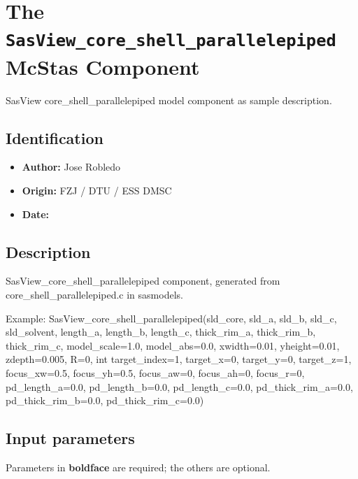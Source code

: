\section{The \texttt{SasView\_core\_shell\_parallelepiped} McStas Component}
SasView core\_shell\_parallelepiped model component as sample description.

\subsection*{Identification}
\begin{itemize}
  \item \textbf{Author:} Jose Robledo
  \item \textbf{Origin:} FZJ / DTU / ESS DMSC
  \item \textbf{Date:} 
\end{itemize}

\subsection*{Description}
SasView\_core\_shell\_parallelepiped component, generated from core\_shell\_parallelepiped.c in sasmodels.

Example: SasView\_core\_shell\_parallelepiped(sld\_core, sld\_a, sld\_b, sld\_c, sld\_solvent, length\_a, length\_b, length\_c, thick\_rim\_a, thick\_rim\_b, thick\_rim\_c, model\_scale=1.0, model\_abs=0.0, xwidth=0.01, yheight=0.01, zdepth=0.005, R=0, int target\_index=1, target\_x=0, target\_y=0, target\_z=1, focus\_xw=0.5, focus\_yh=0.5, focus\_aw=0, focus\_ah=0, focus\_r=0, pd\_length\_a=0.0, pd\_length\_b=0.0, pd\_length\_c=0.0, pd\_thick\_rim\_a=0.0, pd\_thick\_rim\_b=0.0, pd\_thick\_rim\_c=0.0)

\subsection*{Input parameters}
Parameters in \textbf{boldface} are required; the others are optional.


